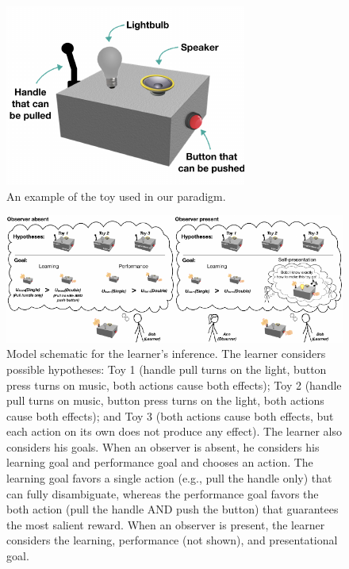\documentclass[10pt, letterpaper]{article}
\newenvironment{CodeChunk}{}{}
\begin{document}
\begin{CodeChunk}
\begin{figure}[b]

{\centering \includegraphics[width=0.65\linewidth]{figs/toy-1} 

}

\caption[An example of the toy used in our paradigm]{An example of the toy used in our paradigm.}\label{fig:toy}
\end{figure}
\end{CodeChunk}

\begin{CodeChunk}
\begin{figure}[tb]

{\centering \includegraphics[width=0.95\linewidth]{figs/model_diagram-1} 

}

\caption[Model schematic for the learner's inference]{Model schematic for the learner's inference. The learner considers possible hypotheses: Toy 1 (handle pull turns on the light, button press turns on music, both actions cause both effects); Toy 2 (handle pull turns on music, button press turns on the light, both actions cause both effects); and Toy 3 (both actions cause both effects, but each action on its own does not produce any effect). The learner also considers his goals. When an observer is absent, he considers his learning goal and performance goal and chooses an action. The learning goal favors a single action (e.g., pull the handle only) that can fully disambiguate, whereas the performance goal favors the both action (pull the handle AND push the button) that guarantees the most salient reward. When an observer is present, the learner considers the learning, performance (not shown), and presentational goal.}\label{fig:model_diagram}
\end{figure}
\end{CodeChunk}
\end{document}
